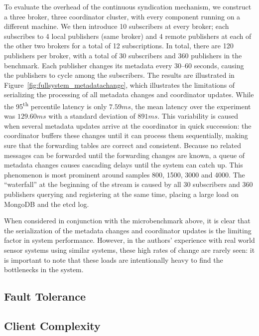 To evaluate the overhead of the continuous syndication mechanism, we construct a three broker, three coordinator cluster, with every component running on a different machine.
We then introduce 10 subscribers at every broker; each subscribes to 4 local publishers (same broker) and 4 remote publishers at each of the other two brokers for a total of 12 subscriptions.
In total, there are 120 publishers per broker, with a total of 30 subscribers and 360 publishers in the benchmark.
Each publisher changes its metadata every 30--60 seconds, causing the publishers to cycle among the subscribers.
The results are illustrated in Figure~\ref{fig:fullsystem_metadatachange}, which illustrates the limitations of serializing the processing of all metadata changes and coordinator updates.
While the 95\textsuperscript{th} percentile latency is only $7.59ms$, the mean latency over the experiment was $129.60ms$ with a standard deviation of $891ms$.
This variability is caused when several metadata updates arrive at the coordinator in quick succession: the coordinator buffers these changes until it can process them sequentially, making sure that the forwarding tables are correct and consistent.
Because no related messages can be forwarded until the forwarding changes are known, a queue of metadata changes causes cascading delays until the system can catch up.
This phenomenon is most prominent around samples 800, 1500, 3000 and 4000.
The ``waterfall'' at the beginning of the stream is caused by all 30 subscribers and 360 publishers querying and registering at the same time, placing a large load on MongoDB and the etcd log.

When considered in conjunction with the microbenchmark above, it is clear that the serialization of the metadata changes and coordinator updates is the limiting factor in system performance.
However, in the authors' experience with real world sensor systems using similar systems, these high rates of change are rarely seen: it is important to note that these loads are intentionally heavy to find the bottlenecks in the system.

\subsection{Fault Tolerance}


\subsection{Client Complexity}

